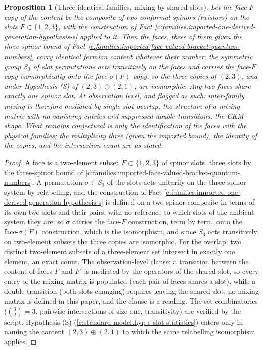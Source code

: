 \documentclass[11pt]{article}
\newtheorem{proposition}[theorem]{Proposition}
\theoremstyle{definition}
\theoremstyle{plain}
\newcommand{\changedmark}[2]{\marginpar{\raggedright\scriptsize\color{#1}#2}}
\begin{document}
\begin{proposition}[Three identical families, mixing by shared slots]\label{c:families.three-identical-families-mixing-shared-slots}
\changedmark{gray}{reworded}
Let the face-$F$ copy of the content be the composite of two conformal spinors (twistors) on the slots $F \subset \{1,2,3\}$, with the construction of Fact \ref{c:families.imported-one-derived-generation-hypothesis-s} applied to it. Then the faces, three of them given the three-spinor bound of Fact \ref{c:families.imported-face-valued-bracket-quantum-numbers}, carry identical fermion content whatever their number: the symmetric group $S_{3}$ of slot permutations acts transitively on the faces and carries the face-$F$ copy isomorphically onto the face-$\sigma(F)$ copy, so the three copies of $(2,3)$, and under Hypothesis (S) of $(2,3) \oplus (2,1)$, are isomorphic. Any two faces share exactly one spinor slot. At observation level, and flagged as such: inter-family mixing is therefore mediated by single-slot overlap, the structure of a mixing matrix with no vanishing entries and suppressed double transitions, the CKM shape. What remains conjectural is only the identification of the faces with the physical families; the multiplicity three (given the imported bound), the identity of the copies, and the intersection count are as stated.
\end{proposition}
\begin{proof}
A face is a two-element subset $F \subset \{1, 2, 3\}$ of spinor slots, three slots by the three-spinor bound of \ref{c:families.imported-face-valued-bracket-quantum-numbers}. A permutation $\sigma \in S_{3}$ of the slots acts unitarily on the three-spinor system by relabelling, and the construction of Fact \ref{c:families.imported-one-derived-generation-hypothesis-s} is defined on a two-spinor composite in terms of its own two slots and their pairs, with no reference to which slots of the ambient system they are; so $\sigma$ carries the face-$F$ construction, term by term, onto the face-$\sigma(F)$ construction, which is the isomorphism, and since $S_{3}$ acts transitively on two-element subsets the three copies are isomorphic. For the overlap: two distinct two-element subsets of a three-element set intersect in exactly one element, an exact count. The observation-level clause: a transition between the content of faces $F$ and $F'$ is mediated by the operators of the shared slot, so every entry of the mixing matrix is populated (each pair of faces shares a slot), while a double transition (both slots changing) requires leaving the shared slot; no mixing matrix is defined in this paper, and the clause is a reading. The set combinatorics ($\binom{3}{2} = 3$, pairwise intersections of size one, transitivity) are verified by the script. Hypothesis (S) (\ref{c:standard-model.hyp-s-slot-statistics}) enters only in naming the content $(2,3) \oplus (2,1)$ to which the same relabelling isomorphism applies.

\end{proof}
\end{document}
